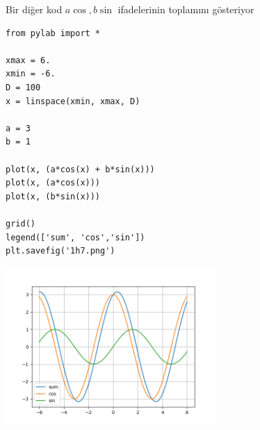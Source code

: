 \documentclass[12pt,fleqn]{article}\usepackage{../../common}
\begin{document}
Bir diğer kod $a \cos,b \sin$ ifadelerinin toplamını gösteriyor

\begin{verbatim}
from pylab import *

xmax = 6.
xmin = -6.
D = 100
x = linspace(xmin, xmax, D)

a = 3
b = 1

plot(x, (a*cos(x) + b*sin(x)))
plot(x, (a*cos(x)))
plot(x, (b*sin(x)))

grid()
legend(['sum', 'cos','sin'])
plt.savefig('1h7.png')
\end{verbatim}

\includegraphics[height=6cm]{1h7.png}
\end{document}
